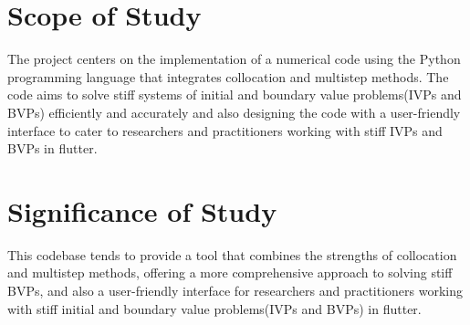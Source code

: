 \section{Scope of Study}
The project centers on the implementation of a numerical code using the Python programming language that integrates collocation and multistep methods. The code aims to solve stiff systems of initial and boundary value problems(IVPs and BVPs) efficiently and accurately and also designing the code with a user-friendly interface to cater to researchers and practitioners working with stiff IVPs and BVPs in flutter.

\section{Significance of Study}
This codebase tends to provide a tool that combines the strengths of collocation and multistep methods, offering a more comprehensive approach to solving stiff BVPs, and also a user-friendly interface for researchers and practitioners working with stiff initial and boundary value problems(IVPs and BVPs) in flutter.


